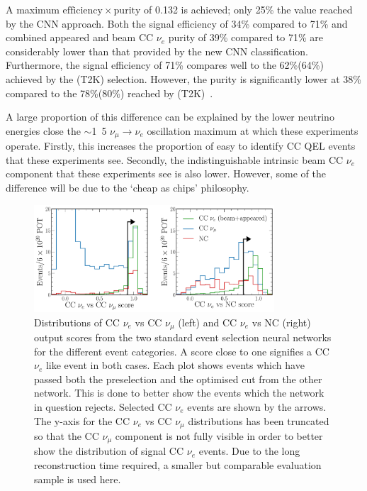 A maximum $\mathrm{efficiency}\times\mathrm{purity}$ of 0.132 is achieved; only 25\% the value
reached by the CNN approach. Both the signal efficiency of 34\% compared to 71\% and combined
appeared and beam CC $\nu_{e}$ purity of 39\% compared to 71\% are considerably lower than that
provided by the new CNN classification. Furthermore, the signal efficiency of 71\% compares well
to the 62\%(64\%) achieved by the \nova(T2K) selection. However, the purity is significantly lower
at 38\% compared to the 78\%(80\%) reached by \nova(T2K)~\cite{acero2019, abe2015}.

A large proportion of this difference can be explained by the lower neutrino energies close the
$\sim$\unit{1.5}{\GeV} $\nu_{\mu}\rightarrow\nu_{e}$ oscillation maximum at which these
experiments operate. Firstly, this increases the proportion of easy to identify CC QEL events that
these experiments see. Secondly, the indistinguishable intrinsic beam CC $\nu_{e}$ component that
these experiments see is also lower. However, some of the difference will be due to the `cheap as
chips' philosophy.

\begin{figure} %
    \includegraphics[width=0.8\textwidth]{diagrams/6-cvn/chipsnet/final_old_pid_outputs.pdf}
    \caption[Distributions of standard event selectio neural network output scores.]
    {Distributions of CC $\nu_{e}$ vs CC $\nu_{\mu}$ (left) and CC $\nu_{e}$ vs NC (right) output
        scores from the two standard event selection neural networks for the different event
        categories. A score close to one signifies a CC $\nu_{e}$ like event in both cases. Each
        plot shows events which have passed both the preselection and the optimised cut from the
        other network. This is done to better show the events which the network in question
        rejects. Selected CC $\nu_{e}$ events are shown by the arrows. The y-axis for the CC
        $\nu_{e}$ vs CC $\nu_{\mu}$ distributions has been truncated so that the CC $\nu_{\mu}$
        component is not fully visible in order to better show the distribution of signal CC
        $\nu_{e}$ events. Due to the long reconstruction time required, a smaller but comparable
        evaluation sample is used here.}
    \label{fig:final_old_pid_outputs}
\end{figure}


